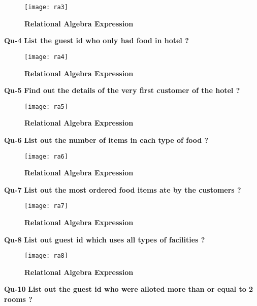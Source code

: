 \documentclass[a4,12pt]{report}
\begin{document}
\begin{figure}[hbtp]
\centering
\texttt{[image: ra3]}
\caption{\textbf{{\color{red}Relational Algebra Expression}}}
\end{figure}

\newpage
\textbf{Qu-4} \textbf{ List the guest id who only had food in hotel ? }\\

\begin{figure}[hbtp]
\centering
\texttt{[image: ra4]}
\caption{\textbf{{\color{red}Relational Algebra Expression}}}
\end{figure}

\textbf{Qu-5} \textbf{ Find out the details of the very first customer of the hotel ?}\\

\begin{figure}[hbtp]
\centering
\texttt{[image: ra5]}
\caption{\textbf{{\color{red}Relational Algebra Expression}}}
\end{figure}

\textbf{Qu-6} \textbf{ List out the number of items in each type of food ? }\\

\begin{figure}[hbtp]
\centering
\texttt{[image: ra6]}
\caption{\textbf{{\color{red}Relational Algebra Expression}}}
\end{figure}

\newpage
\textbf{Qu-7} \textbf{ List out the most ordered food items ate by the customers ? }\\

\begin{figure}[hbtp]
\centering
\texttt{[image: ra7]}
\caption{\textbf{{\color{red}Relational Algebra Expression}}}
\end{figure}

\textbf{Qu-8} \textbf{ List out guest id which uses all types of facilities ? }\\

\begin{figure}[hbtp]
\centering
\texttt{[image: ra8]}
\caption{\textbf{{\color{red}Relational Algebra Expression}}}
\end{figure}



\textbf{Qu-10} \textbf{ List out the guest id who were alloted more than or equal to 2 rooms ?}\\
\end{document}
